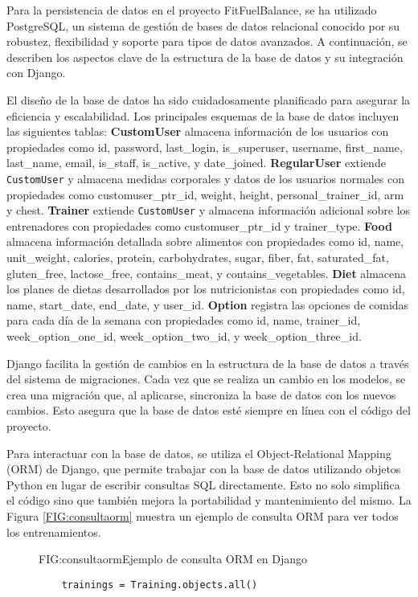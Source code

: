 Para la persistencia de datos en el proyecto FitFuelBalance, se ha utilizado PostgreSQL, un sistema de gestión de bases de datos relacional conocido por su robustez, flexibilidad y soporte para tipos de datos avanzados. A continuación, se describen los aspectos clave de la estructura de la base de datos y su integración con Django.

El diseño de la base de datos ha sido cuidadosamente planificado para asegurar la eficiencia y escalabilidad. Los principales esquemas de la base de datos incluyen las siguientes tablas: \textbf{CustomUser} almacena información de los usuarios con propiedades como id, password, last\_login, is\_superuser, username, first\_name, last\_name, email, is\_staff, is\_active, y date\_joined. \textbf{RegularUser} extiende \texttt{CustomUser} y almacena medidas corporales y datos de los usuarios normales con propiedades como customuser\_ptr\_id, weight, height, personal\_trainer\_id, arm y chest. \textbf{Trainer} extiende \texttt{CustomUser} y almacena información adicional sobre los entrenadores con propiedades como customuser\_ptr\_id y trainer\_type. \textbf{Food} almacena información detallada sobre alimentos con propiedades como id, name, unit\_weight, calories, protein, carbohydrates, sugar, fiber, fat, saturated\_fat, gluten\_free, lactose\_free, contains\_meat, y contains\_vegetables. \textbf{Diet} almacena los planes de dietas desarrollados por los nutricionistas con propiedades como id, name, start\_date, end\_date, y user\_id. \textbf{Option} registra las opciones de comidas para cada día de la semana con propiedades como id, name, trainer\_id, week\_option\_one\_id, week\_option\_two\_id, y week\_option\_three\_id.

Django facilita la gestión de cambios en la estructura de la base de datos a través del sistema de migraciones. Cada vez que se realiza un cambio en los modelos, se crea una migración que, al aplicarse, sincroniza la base de datos con los nuevos cambios. Esto asegura que la base de datos esté siempre en línea con el código del proyecto.

Para interactuar con la base de datos, se utiliza el Object-Relational Mapping (ORM) de Django, que permite trabajar con la base de datos utilizando objetos Python en lugar de escribir consultas SQL directamente. Esto no solo simplifica el código sino que también mejora la portabilidad y mantenimiento del mismo. La Figura \ref{FIG:consultaorm} muestra un ejemplo de consulta ORM para ver todos los entrenamientos.

\begin{figure}[Ejemplo Consulta ORM]{FIG:consultaorm}{Ejemplo de consulta ORM en Django}
\begin{verbatim}
    trainings = Training.objects.all()
\end{verbatim}
\end{figure}

